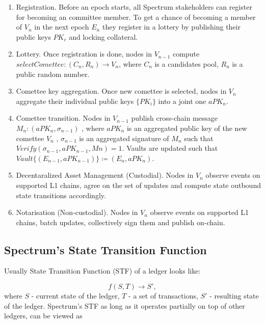 \documentclass{article}
\begin{document}
    \begin{enumerate}
        \item Registration.
        Before an epoch starts, all Spectrum stakeholders can register for becoming an committee member.
        To get a chance of becoming a member of $V_n$ in the next epoch $E_n$ they register in a lottery
        by publishing their public keys $PK_c$ and locking collateral.
        \item Lottery.
        Once registration is done, nodes in $V_{n-1}$ compute $selectComettee: (C_n, R_n) \rightarrow V_n$,
        where  $C_n$ is a candidates pool, $R_n$ is a public random number.
        \item Comettee key aggregation.
        Once new comettee is selected, nodes in $V_n$ aggregate their individual public keys $\{PK_i\}$ into
        a joint one $aPK_n$.
        \item Comettee transition.
        Nodes in $V_{n-1}$ publish cross-chain message $M_n : (aPK_n, \sigma_{n-1})$ , where $aPK_n$ is
        an aggregated public key of the new comettee $V_n$ , $\sigma_{n-1}$ is an aggregated signature of
        $M_n$ such that $Verify(\sigma_{n-1}, aPK_{n-1}, Mn) = 1$.
        Vaults are updated such that $Vault\{(E_{n-1}, aPK_{n-1})\} \coloneqq (E_n, aPK_n)$.
        \item Decentaralized Asset Management (Custodial).
        Nodes in $V_n$ observe events on supported L1 chains, agree on the set of updates
        and compute state outbound state transitions accordingly.
        \item Notarisation (Non-custodial).
        Nodes in $V_n$ observe events on supported L1 chains, batch updates, collectively sign them and
        publish on-chain.
    \end{enumerate}


    \subsection{Spectrum's State Transition Function}
    Usually State Transition Function (STF) of a ledger looks like:

    \begin{equation}
        f(S, T) \rightarrow S',\label{eq:equation1}
    \end{equation}
    where $S$ - current state of the ledger, $T$ - a set of transactions, $S'$ - resulting state of the ledger.
    Spectrum's STF as long as it operates partially on top of other ledgers, can be viewed as
\end{document}
